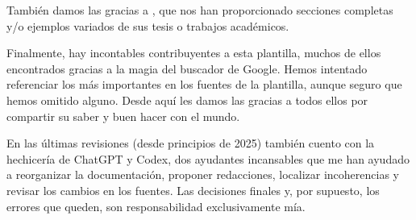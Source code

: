 También damos las gracias a , que nos han proporcionado secciones completas y/o ejemplos variados de sus tesis o trabajos académicos.

Finalmente, hay incontables contribuyentes a esta plantilla, muchos de ellos encontrados gracias a la magia del buscador de Google. Hemos intentado referenciar los más importantes en los fuentes de la plantilla, aunque seguro que hemos omitido alguno. Desde aquí les damos las gracias a todos ellos por compartir su saber y buen hacer con el mundo.

En las últimas revisiones (desde principios de 2025) también cuento con la hechicería de ChatGPT y Codex, dos ayudantes incansables que me han ayudado a reorganizar la documentación, proponer redacciones, localizar incoherencias y revisar los cambios en los fuentes. Las decisiones finales y, por supuesto, los errores que queden, son responsabilidad exclusivamente mía.





